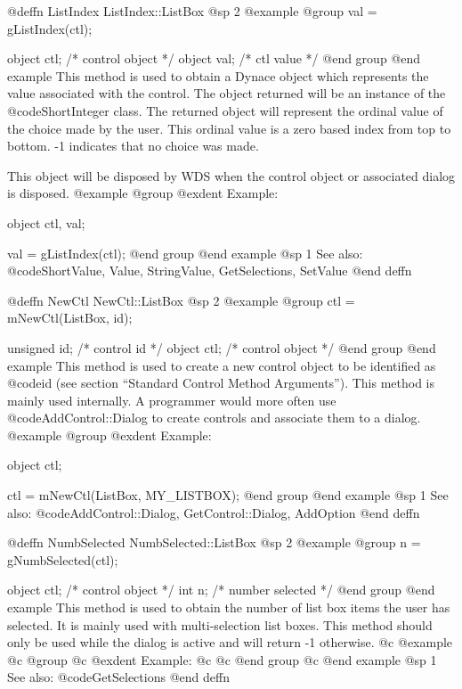 @deffn {ListIndex} ListIndex::ListBox
@sp 2
@example
@group
val = gListIndex(ctl);

object  ctl;   /*  control object  */
object  val;   /*  ctl value       */
@end group
@end example
This method is used to obtain a Dynace object which represents the value
associated with the control.  The object returned will be an instance of
the @code{ShortInteger} class.  The returned object will represent the
ordinal value of the choice made by the user.  This ordinal value is a
zero based index from top to bottom.  -1 indicates that no choice was
made.

This object will be disposed by WDS when the control object or
associated dialog is disposed.
@example
@group
@exdent Example:

object  ctl, val;

val = gListIndex(ctl);
@end group
@end example
@sp 1
See also:  @code{ShortValue, Value, StringValue, GetSelections, SetValue}
@end deffn




@deffn {NewCtl} NewCtl::ListBox
@sp 2
@example
@group
ctl = mNewCtl(ListBox, id);

unsigned  id;   /*  control id      */
object   ctl;   /*  control object  */
@end group
@end example
This method is used to create a new control object to be identified as
@code{id} (see section ``Standard Control Method Arguments'').  This
method is mainly used internally.  A programmer would more often
use @code{AddControl::Dialog} to create controls and associate them
to a dialog.
@example
@group
@exdent Example:

object  ctl;

ctl = mNewCtl(ListBox, MY_LISTBOX);
@end group
@end example
@sp 1
See also:  @code{AddControl::Dialog, GetControl::Dialog, AddOption}
@end deffn











@deffn {NumbSelected} NumbSelected::ListBox
@sp 2
@example
@group
n = gNumbSelected(ctl);

object  ctl;    /*  control object   */
int     n;      /*  number selected  */
@end group
@end example
This method is used to obtain the number of list box items the user
has selected.  It is mainly used with multi-selection list boxes.
This method should only be used while the dialog is active and
will return -1 otherwise.
@c @example
@c @group
@c @exdent Example:
@c 
@c @end group
@c @end example
@sp 1
See also:  @code{GetSelections}
@end deffn














